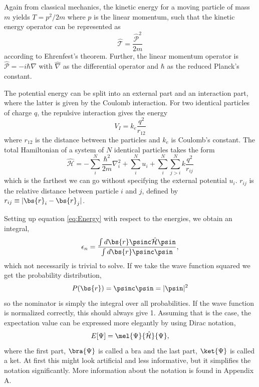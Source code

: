 Again from classical mechanics, the kinetic energy for a moving particle of mass $m$ yields $T=p^2/2m$ where $p$ is the linear momentum, such that the kinetic energy operator can be represented as 
\begin{equation}
\hat{\mathcal{T}}=\frac{\hat{\mathcal{P}}^2}{2m}
\end{equation}
according to Ehrenfest's theorem. Further, the linear momentum operator is $\hat{\mathcal{P}}=-i\hbar\hat{\nabla}$ with $\hat{\nabla}$ as the differential operator and $\hbar$ as the reduced Planck's constant.

The potential energy can be split into an external part and an interaction part, where the latter is given by the Coulomb interaction. For two identical particles of charge $q$, the repulsive interaction gives the energy
\begin{equation}
V_I=k_e\frac{q^2}{r_{12}}
\end{equation}
where $r_{12}$ is the distance between the particles and $k_e$ is Coulomb's constant. The total Hamiltonian of a system of $N$ identical particles takes the form
\begin{equation}
\hat{\mathcal{H}}=-\sum_i^N\frac{\hbar^2}{2m}\nabla_i^2+\sum_i^{N}u_i + \sum_i^N\sum_{j>i}^Nk\frac{q^2}{r_{ij}}
\label{eq:ElectronicHamiltonian}
\end{equation}
which is the farthest we can go without specifying the external potential $u_i$. $r_{ij}$ is the relative distance between particle $i$ and $j$, defined by $r_{ij}\equiv|\bs{r}_i-\bs{r}_j|$.

Setting up equation \eqref{eq:Energy} with respect to the energies, we obtain an integral,
\begin{equation}
\epsilon_n=\frac{\int d\bs{r}\psinc\hat{\mathcal{H}}\psin}{\int d\bs{r}\psinc\psin},
\label{eq:energyintegral}
\end{equation}
which not necessarily is trivial to solve. If we take the wave function squared we get the probability distribution,
\begin{equation}
P(\bs{r})=\psinc\psin=|\psin|^2
\end{equation}
so the nominator is simply the integral over all probabilities. If the wave function is normalized correctly, this should always give 1. Assuming that is the case, the expectation value can be expressed more elegantly by using Dirac notation,
\begin{equation}
E[\Psi]=\mel{\Psi}{\hat{\mathcal{H}}}{\Psi},
\end{equation}
where the first part, $\bra{\Psi}$ is called a bra and the last part, $\ket{\Psi}$ is called a ket. At first this might look artificial and less informative, but it simplifies the notation significantly. More information about the notation is found in Appendix A. 

